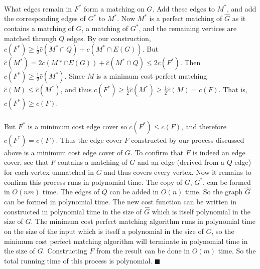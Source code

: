 \documentclass[letterpaper,12pt,oneside,onecolumn]{report}
\begin{document}
\paragraph{}
What edges remain in $F^*$ form a matching on $G$. Add these edges to $M^*$, and add the corresponding edges of $G^*$ to $M^*$. Now $M^*$ is a perfect matching of $\hat{G}$ as it contains a matching of $G$, a matching of $G^*$, and the remaining vertices are matched through $Q$ edges. By our construction, $c(F^*) \geq \frac{1}{2}\hat{c}(M^* \cap Q) + c(M^* \cap E(G))$. But $\hat{c}(M^*) = 2c(M* \cap E(G)) + \hat{c}(M^* \cap Q) \leq 2c(F^*)$. Then $c(F^*) \geq \frac{1}{2} \hat{c}(M^*)$. Since $M$ is a minimum cost perfect matching $\hat{c}(M) \leq \hat{c}(M^*)$, and thus $c(F^*) \geq \frac{1}{2} \hat{c}(M^*) \geq \frac{1}{2}\hat{c}(M) = c(F)$. That is, $c(F^*) \geq c(F)$.
\paragraph{}
But $F^*$ is a minimum cost edge cover so $c(F^*) \leq c(F)$, and therefore $c(F^*) = c(F)$. Thus the edge cover $F$ constructed by our process discussed above is a minimum cost edge cover of $G$. To confirm that $F$ is indeed an edge cover, see that $F$ contains a matching of $G$ and an edge (derived from a $Q$ edge) for each vertex unmatched in $G$ and thus covers every vertex. Now it remains to confirm this process runs in polynomial time. The copy of $G$, $G^*$, can be formed in $O(nm)$ time. The edges of $Q$ can be added in $O(n)$ time. So the graph $\hat{G}$ can be formed in polynomial time. The new cost function can be written in constructed in polynomial time in the size of $\hat{G}$ which is itself polynomial in the size of $G$. The minimum cost perfect matching algorithm runs in polynomial time on the size of the input which is itself a polynomial in the size of $G$, so the minimum cost perfect matching algorithm will terminate in polynomial time in the size of $G$. Constructing $F$ from the result can be done in $O(m)$ time. So the total running time of this process is polynomial. $\blacksquare$
\end{document}

